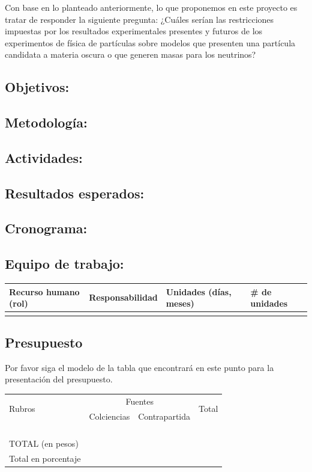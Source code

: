 \begin{proyecto}
  Con base en lo planteado anteriormente, lo que proponemos en este
  proyecto es tratar de responder la siguiente pregunta: ¿Cuáles
  serían las restricciones impuestas por los resultados experimentales
  presentes y futuros de los experimentos de física de partículas
  sobre modelos que presenten una partícula candidata a materia oscura
  o que generen masas para los neutrinos?
\end{proyecto}
 

\subsection{Objetivos:                                     }
\subsection{Metodología:                                   }
\subsection{Actividades:                                   }
\subsection{Resultados esperados:                          }
\subsection{Cronograma:                                    }

\subsection{Equipo de trabajo:}
\begin{tabular}{|l|l|l|l|}\hline
Recurso humano (rol)& Responsabilidad& Unidades (días, meses)& \# de unidades\\\hline
&&&\\\hline
\end{tabular}

\subsection{Presupuesto}
\begin{instrucciones}
  Por favor siga el modelo de la tabla que encontrará en este punto para la presentación del presupuesto.
\end{instrucciones}
\begin{tabular}{|l|l|l|l|}\hline
  \multirow{2}{*}{Rubros}&\multicolumn{2}{c}{Fuentes}\vline&\multirow{2}{*}{Total}\\
  \cline{2-3} & Colciencias & Contrapartida & \\\hline 
 & & &\\\hline
 & & &\\\hline
 & & &\\\hline
 & & &\\\hline
TOTAL (en pesos) & & &\\\hline
Total en porcentaje & & &\\\hline
\end{tabular}

